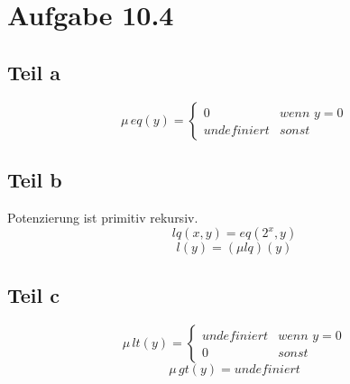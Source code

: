 \documentclass[10pt,a4paper]{article}
\begin{document}
\section{Aufgabe 10.4}

\subsection{Teil a}

\begin{equation}
  \mu \, eq (y) = \begin{cases}
    0 & \textit{wenn $y = 0$}\\
    undefiniert & \textit{sonst}
  \end{cases}
\end{equation}

\subsection{Teil b}

Potenzierung ist primitiv rekursiv.
\begin{equation}
  lq(x, y) = eq(2^{x}, y)
\end{equation}
\begin{equation}
  l(y) = (\mu lq)(y)
\end{equation}

\subsection{Teil c}

\begin{equation}
  \mu\, lt(y) = \begin{cases}
    undefiniert & \textit{wenn $y = 0$}\\
    0 & \textit{sonst}
  \end{cases}
\end{equation}
\begin{equation}
  \mu\, gt(y) = undefiniert
\end{equation}
\end{document}
